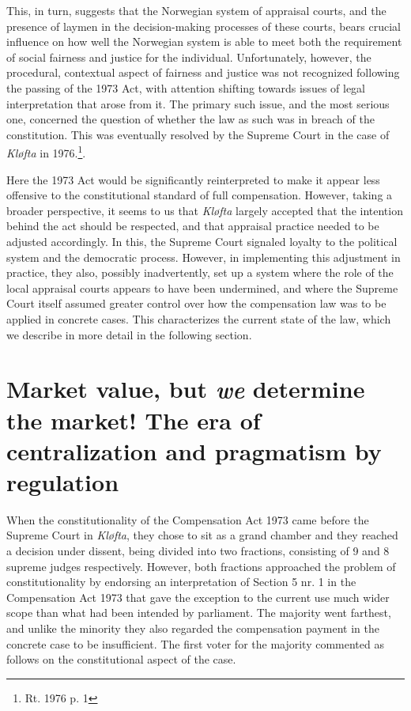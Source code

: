 \documentclass[10pt]{article} %
\begin{document}
This, in turn, suggests that the Norwegian system of appraisal courts, and the presence of laymen in the decision-making processes of these courts, bears crucial influence on how well the Norwegian system is able to meet both the requirement of social fairness and justice for the individual. Unfortunately, however, the procedural, contextual aspect of fairness and justice was not recognized following the passing of the 1973 Act, with attention shifting towards issues of legal interpretation that arose from it. The primary such issue, and the most serious one, concerned the question of whether the law as such was in breach of the constitution. This  was eventually resolved by the Supreme Court in the case of \emph{Kløfta} in 1976.\footnote{Rt. 1976 p. 1}. 

Here the 1973 Act would be significantly reinterpreted to make it appear less offensive to the constitutional standard of full compensation. However, taking a broader perspective, it seems to us that \emph{Kløfta} largely accepted that the intention behind the act should be respected, and that appraisal practice needed to be adjusted accordingly. In this, the Supreme Court signaled loyalty to the political system and the democratic process. However, in implementing this adjustment in practice, they also, possibly inadvertently, set up a system where the role of the local appraisal courts appears to have been undermined, and where the Supreme Court itself assumed greater control over how the compensation law was to be applied in concrete cases. This characterizes the current state of the law, which we describe in more detail in the following section.

\section{Market value, but \emph{we} determine the market! The era of centralization and pragmatism by regulation}\label{sec:regab}

When the constitutionality of the Compensation Act 1973 came before the Supreme Court in \emph{Kløfta}, they chose to sit as a grand chamber and they reached a decision under dissent, being divided into two fractions, consisting of 9 and 8 supreme judges respectively. However, both fractions approached the problem of constitutionality by endorsing an interpretation of Section 5 nr. 1 in the Compensation Act 1973 that gave the exception to the current use much wider scope than what had been intended by parliament. The majority went farthest, and unlike the minority they also regarded the compensation payment in the concrete case to be insufficient. The first voter for the majority commented as follows on the constitutional aspect of the case.
\end{document}
